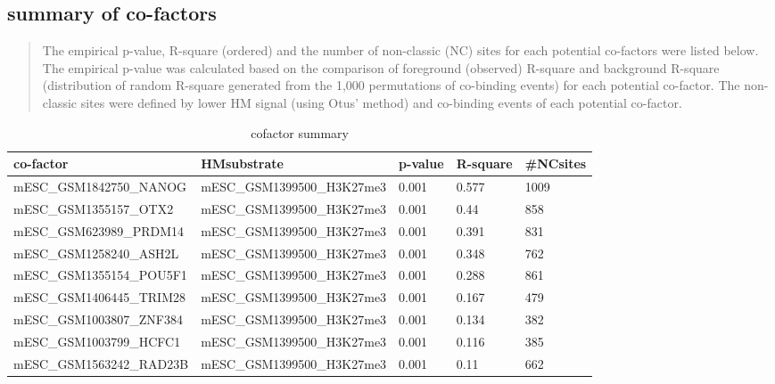 \documentclass[11pt,a4paper]{article}
\begin{document}
\subsection{summary of co-factors}
\begin{quotation}
The empirical p-value, R-square (ordered) and the number of non-classic (NC) sites for each potential co-factors were listed below. The empirical p-value was calculated based on the comparison of foreground (observed) R-square and background R-square (distribution of random R-square generated from the 1,000 permutations of co-binding events) for each potential co-factor. The non-classic sites were defined by lower HM signal (using Otus' method) and co-binding events of each potential co-factor.
\end{quotation}
\begin{table}[h]
\caption{cofactor summary}\label{bstable}
\begin{tabularx}{\textwidth}{ |l|X|X|X|X| }
    
\hline
co-factor & HMsubstrate & p-value & R-square & \#NCsites \\
\hline
mESC\_GSM1842750\_NANOG & mESC\_GSM1399500\_H3K27me3 & 0.001 & 0.577 & 1009 \\
\hline
mESC\_GSM1355157\_OTX2 & mESC\_GSM1399500\_H3K27me3 & 0.001 & 0.44 & 858 \\
\hline
mESC\_GSM623989\_PRDM14 & mESC\_GSM1399500\_H3K27me3 & 0.001 & 0.391 & 831 \\
\hline
mESC\_GSM1258240\_ASH2L & mESC\_GSM1399500\_H3K27me3 & 0.001 & 0.348 & 762 \\
\hline
mESC\_GSM1355154\_POU5F1 & mESC\_GSM1399500\_H3K27me3 & 0.001 & 0.288 & 861 \\
\hline
mESC\_GSM1406445\_TRIM28 & mESC\_GSM1399500\_H3K27me3 & 0.001 & 0.167 & 479 \\
\hline
mESC\_GSM1003807\_ZNF384 & mESC\_GSM1399500\_H3K27me3 & 0.001 & 0.134 & 382 \\
\hline
mESC\_GSM1003799\_HCFC1 & mESC\_GSM1399500\_H3K27me3 & 0.001 & 0.116 & 385 \\
\hline
mESC\_GSM1563242\_RAD23B & mESC\_GSM1399500\_H3K27me3 & 0.001 & 0.11 & 662 \\

\hline
\end{tabularx}
\end{table}
\newpage
\newpage
\end{document}

